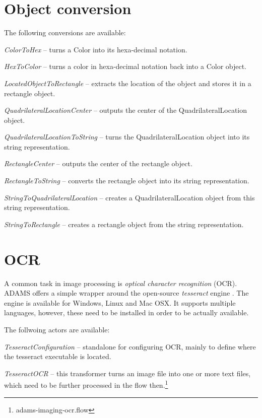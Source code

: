 \documentclass[a4paper]{book}
\begin{document}
\chapter{Object conversion}
The following conversions are available:
\begin{tight_itemize}
  \item \textit{ColorToHex} -- turns a Color into its hexa-decimal
  notation.
  \item \textit{HexToColor} -- turns a color in hexa-decimal notation back
  into a Color object.
  \item \textit{LocatedObjectToRectangle} -- extracts the location of the
  object and stores it in a rectangle object.
  \item \textit{QuadrilateralLocationCenter} -- outputs the center of the
  QuadrilateralLocation object.
  \item \textit{QuadrilateralLocationToString} -- turns the
  QuadrilateralLocation object into its string representation.
  \item \textit{RectangleCenter} -- outputs the center of the rectangle object.
  \item \textit{RectangleToString} -- converts the rectangle object into its
  string representation.
  \item \textit{StringToQuadrilateralLocation} -- creates a QuadrilateralLocation
  object from this string representation.
  \item \textit{StringToRectangle} -- creates a rectangle object from the string
  representation.
\end{tight_itemize}


\chapter{OCR}
A common task in image processing is \textit{optical character recognition} 
(OCR). ADAMS offers a simple wrapper around the open-source \textit{tesseract} 
engine \cite{tesseract}. The engine is available for Windows, Linux and Mac OSX.
It supports multiple languages, however, these need to be installed in order to
be actually available.

The follwoing actors are available:
\begin{tight_itemize}
	\item \textit{TesseractConfiguration} -- standalone for configuring OCR, 
	mainly to define where the tesseract executable is located.
	\item \textit{TesseractOCR} -- this transformer turns an image file into
	one or more text files, which need to be further processed in the flow
	then.\footnote{adams-imaging-ocr.flow}
\end{tight_itemize}
\end{document}
